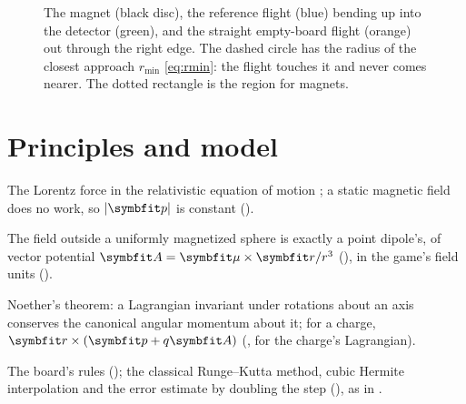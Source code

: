 \documentclass{leveldoc}
\begin{document}
\begin{figure}[htbp]
\centering
{}
\caption{The magnet (black disc), the reference flight (blue) bending up into the detector
(green), and the straight empty-board flight (orange) out through the right edge. The dashed
circle has the radius of the closest approach $r_\mathrm{min}$ \eqref{eq:rmin}: the flight
touches it and never comes nearer. The dotted rectangle is the region for magnets.}
\label{fig:board}
\end{figure}

\section{Principles and model}\label{sec:model}

\begin{principles}
  \item The Lorentz force in the relativistic equation of motion
    ; a static magnetic field does no work, so $\abs{\vect{p}}$ is
    constant ().
  \item The field outside a uniformly magnetized sphere is exactly a point dipole's, of
    vector potential $\vect{A} = \vect{\mu}\times\vect{r}/r^3$ (), in the
    game's field units ().
  \item Noether's theorem: a Lagrangian invariant under rotations about an axis conserves the
    canonical angular momentum about it; for a charge, $\vect{r}\times(\vect{p} + q\vect{A})$
    (,  for the charge's Lagrangian).
  \item The board's rules (); the classical Runge--Kutta method,
    cubic Hermite interpolation and the error estimate by doubling the step
    (), as in .
\end{principles}
\end{document}
